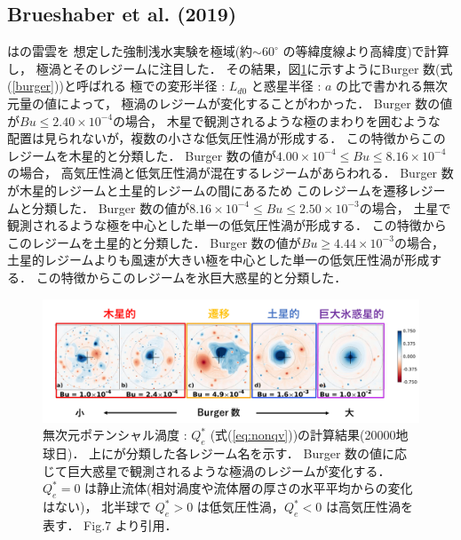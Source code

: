 \documentclass[a4j,12pt,openbib,oneside]{jreport}
\begin{document}
\subsection{Brueshaber et al. (2019)}
\label{sec:intro22}
\cite{Brueshaber2019}は\cite{Showman2007}の雷雲を
想定した強制浅水実験を極域(約$\sim 60^\circ$ の等緯度線より高緯度)で計算し，
極渦とそのレジームに注目した．
その結果，図\ref{fig4}に示すようにBurger 数(式(\ref{burger}))と呼ばれる
極での変形半径 : $L_{d0}$ と惑星半径 : $a$ の比で書かれる無次元量の値によって，
極渦のレジームが変化することがわかった．
%
Burger 数の値が$Bu \leq 2.40 \times 10^{-4}$の場合，
木星で観測されるような極のまわりを囲むような
配置は見られないが，複数の小さな低気圧性渦が形成する．
この特徴からこのレジームを木星的と分類した．
%
Burger 数の値が$4.00 \times 10^{-4 } \leq  Bu \leq  8.16 \times 10^{-4}$の場合，
高気圧性渦と低気圧性渦が混在するレジームがあらわれる．
Burger 数が木星的レジームと土星的レジームの間にあるため
このレジームを遷移レジームと分類した．
%
Burger 数の値が$8.16 \times 10^{-4 } \leq Bu \leq  2.50 \times 10^{-3}$の場合，
土星で観測されるような極を中心とした単一の低気圧性渦が形成する．
この特徴からこのレジームを土星的と分類した．
%
Burger 数の値が$Bu \geq 4.44 \times 10^{-3 }$の場合，
土星的レジームよりも風速が大きい極を中心とした単一の低気圧性渦が形成する．
この特徴からこのレジームを氷巨大惑星的と分類した．
%
\begin{figure}[H]
  \begin{center}
    \includegraphics[clip,width=14cm]{./fig/intro/fig4_2.png}
    \caption{
      \footnotesize{無次元ポテンシャル渦度 : $Q_e^*$ (式(\ref{eq:nonqv}))の計算結果(20000地球日)．
上に\cite{Brueshaber2019}が分類した各レジーム名を示す．
Burger 数の値に応じて巨大惑星で観測されるような極渦のレジームが変化する．
$Q_e^* = 0$ は静止流体(相対渦度や流体層の厚さの水平平均からの変化はない)，
北半球で $Q_e^* > 0$ は低気圧性渦，$Q_e^* < 0$ は高気圧性渦を表す．
\cite{Brueshaber2019} Fig.7 より引用．
      }
    }
    \label{fig4}
  \end{center}
\end{figure}
%
\def\intro3{研究目的}
\end{document}
